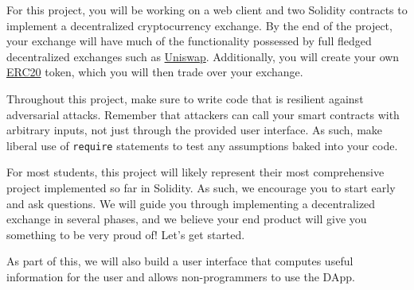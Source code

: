 \documentclass[11pt]{article}
\begin{document}
\newlength{\boxwidth}
\setlength{\boxwidth}{\textwidth}
\addtolength{\boxwidth}{-2cm}

\vspace{1cm}

For this project, you will be working on a web client and two Solidity contracts to implement a decentralized cryptocurrency exchange. By the end of the project, your exchange will have much of the functionality possessed by full fledged decentralized exchanges such as \href{https://uniswap.org/}{Uniswap}. Additionally, you will create your own \href{https://ethereum.org/en/developers/docs/standards/tokens/erc-20/}{ERC20} token, which you will then trade over your exchange.

Throughout this project, make sure to write code that is resilient against adversarial attacks. Remember that attackers can call your smart contracts with arbitrary inputs, not just through the provided user interface. As such, make liberal use of \texttt{require} statements to test any assumptions baked into your code. %


For most students, this project will likely represent their most comprehensive project implemented so far in Solidity. As such, we encourage you to start early and ask questions. We will guide you through implementing a decentralized exchange in several phases, and we believe your end product will give you something to be very proud of! Let's get started.

As part of this, we will also build a user interface that computes useful information for the user and allows non-programmers to use the DApp.
\end{document}
